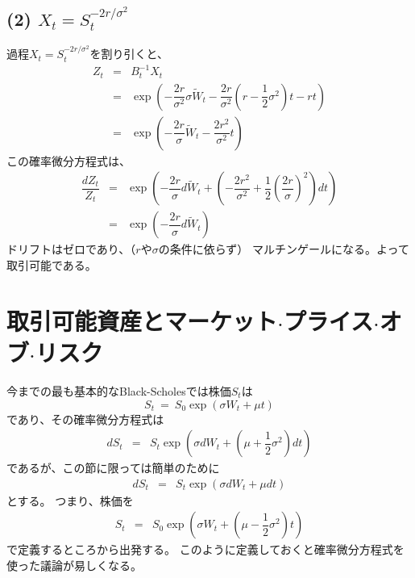 \documentclass[uplatex,a4j,12pt,dvipdfmx]{jsarticle}
\begin{document}
\subsection*{(2) $X_{t} = S^{-2r/\sigma^{2}}_{t}$}

過程$X_{t} = S^{-2r/\sigma^{2}}_{t}$を割り引くと、
%
%
\begin{eqnarray*}
	Z_{t}
	&=&
	B^{-1}_{t} X_{t}
	\\ &=&
	\exp \left(
	-\dfrac{2r}{\sigma^{2}}
	\sigma \tilde{W}_{t}
	-\dfrac{2r}{\sigma^{2}}
	\left(
	r - \dfrac{1}{2} \sigma^{2}
	\right)
	t
	-rt
	\right)
	\\ &=&
	\exp \left(
	-\dfrac{2r}{\sigma}
	\tilde{W}_{t}
	-
	\dfrac{2r^{2}}{\sigma^{2}}
	t
	\right)
\end{eqnarray*}
%
%
この確率微分方程式は、
%
%
\begin{eqnarray*}
	\dfrac{dZ_{t}}{Z_{t}}
	&=&
	\exp \left(
	-\dfrac{2r}{\sigma}
	d \tilde{W}_{t}
	+
	\left(
		-
		\dfrac{2r^{2}}{\sigma^{2}}
		+
		\dfrac{1}{2}
		\left( \dfrac{2r}{\sigma} \right)^{2}
		\right)
	d t
	\right)
	\\ &=&
	\exp \left(
	-\dfrac{2r}{\sigma}
	d \tilde{W}_{t}
	\right)
\end{eqnarray*}
%
%
ドリフトはゼロであり、（$r$や$\sigma$の条件に依らず）
マルチンゲールになる。よって取引可能である。

\section*{取引可能資産とマーケット$\cdot$プライス$\cdot$オブ$\cdot$リスク}

今までの最も基本的なBlack-Scholesでは株価$S_{t}$は
$$
	S_{t}
	\ = \
	S_{0} \exp ( \sigma W_{t} + \mu t )
$$
であり、その確率微分方程式は
%
%
\begin{eqnarray*}
	d S_{t}
	&=&
	S_{t} \exp \left( \sigma dW_{t} + \left( \mu + \dfrac{1}{2} \sigma^{2} \right) dt \right)
\end{eqnarray*}
%
%
であるが、この節に限っては簡単のために
%
%
\begin{eqnarray*}
	d S_{t}
	&=&
	S_{t} \exp \left( \sigma dW_{t} + \mu dt \right)
\end{eqnarray*}
%
%
とする。
つまり、株価を
%
%
\begin{eqnarray*}
	S_{t}
	&=&
	S_{0} \exp \left( \sigma W_{t} + \left( \mu - \dfrac{1}{2} \sigma^{2} \right) t \right)
\end{eqnarray*}
%
%
で定義するところから出発する。
このように定義しておくと確率微分方程式を使った議論が易しくなる。
\end{document}

